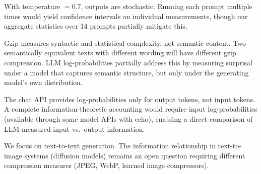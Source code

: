 With temperature $= 0.7$, outputs are stochastic. Running each prompt multiple times would yield confidence intervals on individual measurements, though our aggregate statistics over 14 prompts partially mitigate this.

Gzip measures syntactic and statistical complexity, not semantic content. Two semantically equivalent texts with different wording will have different gzip compression. LLM log-probabilities partially address this by measuring surprisal under a model that captures semantic structure, but only under the generating model's own distribution.

The chat API provides log-probabilities only for output tokens, not input tokens. A complete information-theoretic accounting would require input log-probabilities (available through some model APIs with echo), enabling a direct comparison of LLM-measured input vs.\ output information.

We focus on text-to-text generation. The information relationship in text-to-image systems (\eg diffusion models) remains an open question requiring different compression measures (JPEG, WebP, learned image compressors).
